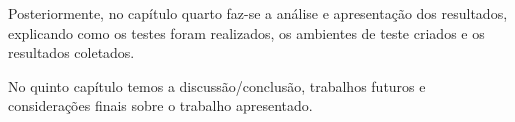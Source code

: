 Posteriormente, no capítulo quarto faz-se a análise e apresentação dos resultados, explicando como os testes foram realizados, os ambientes de teste criados e os resultados coletados.

No quinto capítulo temos a discussão/conclusão, trabalhos futuros e considerações finais sobre o trabalho apresentado.


%
%
%


